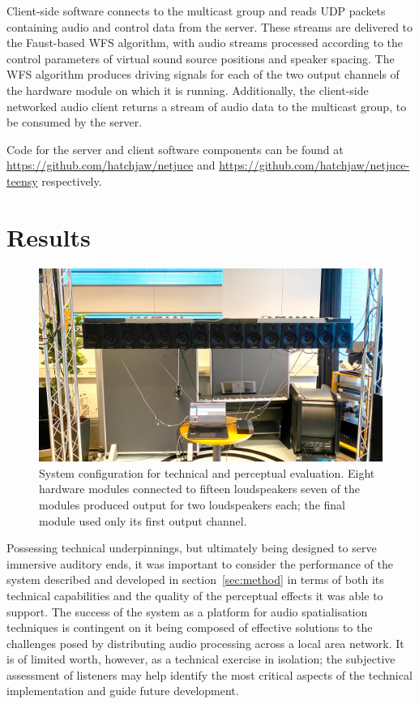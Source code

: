 \documentclass[utf8]{FrontiersinHarvard}
\newcommand{\secref}[1]{section~\ref{#1}}
\begin{document}
    Client-side software connects to the multicast group and reads UDP packets
    containing audio and control data from the server.
    These streams are delivered to the Faust-based WFS algorithm, with audio
    streams processed according to the control parameters of virtual sound source
    positions and speaker spacing.
    The WFS algorithm produces driving signals for each of the two output channels
    of the hardware module on which it is running.
    Additionally, the client-side networked audio client returns a stream of audio
    data to the multicast group, to be consumed by the server.

    Code for the server and client software components can be found at
    \url{https://github.com/hatchjaw/netjuce} and
    \url{https://github.com/hatchjaw/netjuce-teensy} respectively.


    \section{Results}\label{sec:results}

    \begin{figure}[ht]
        \centering
        \includegraphics[width=\textwidth]{figures/eval-setup}
        \caption{
            System configuration for technical and perceptual evaluation.
            Eight hardware modules connected to fifteen loudspeakers \textemdash{}
            seven of the modules produced output for two loudspeakers each; the
            final module used only its first output channel.
        }
        \label{fig:eval-setup}
    \end{figure}

    Possessing technical underpinnings, but ultimately being designed to
    serve immersive auditory ends, it was important to consider the performance of
    the system described and developed in \secref{sec:method} in terms of
    both its technical capabilities and the quality of the perceptual effects it
    was able to support.
    The success of the system as a platform for audio spatialisation techniques is
    contingent on it being composed of effective solutions to the challenges posed
    by distributing audio processing across a local area network.
    It is of limited worth, however, as a technical exercise in isolation;
    the subjective assessment of listeners may help identify the most critical
    aspects of the technical implementation and guide future development.
\end{document}
